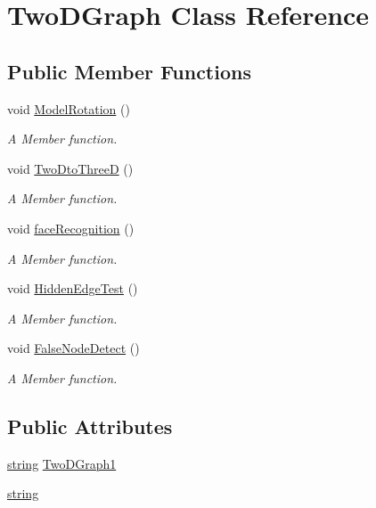 \hypertarget{classTwoDGraph}{}\section{Two\+D\+Graph Class Reference}
\label{classTwoDGraph}
\subsection*{Public Member Functions}
\begin{DoxyCompactItemize}
\item 
void \hyperlink{classTwoDGraph_a1eb77cb9e303bdcd28f985a1f3ca02b4}{Model\+Rotation} ()
\begin{DoxyCompactList}\small\item\em A Member function. \end{DoxyCompactList}\item 
void \hyperlink{classTwoDGraph_a54093bf95a87106de242cc8b8050243e}{Two\+Dto\+ThreeD} ()
\begin{DoxyCompactList}\small\item\em A Member function. \end{DoxyCompactList}\item 
void \hyperlink{classTwoDGraph_a7606c71011057d955db34a43e672ffd9}{face\+Recognition} ()
\begin{DoxyCompactList}\small\item\em A Member function. \end{DoxyCompactList}\item 
void \hyperlink{classTwoDGraph_af25742b8b2903fe231a7ccbbfbb48e08}{Hidden\+Edge\+Test} ()
\begin{DoxyCompactList}\small\item\em A Member function. \end{DoxyCompactList}\item 
void \hyperlink{classTwoDGraph_a48b9e1804733df394bd2bc2c78fec6aa}{False\+Node\+Detect} ()
\begin{DoxyCompactList}\small\item\em A Member function. \end{DoxyCompactList}\end{DoxyCompactItemize}
\subsection*{Public Attributes}
\begin{DoxyCompactItemize}
\item 
\hyperlink{classTwoDGraph_ab537370d1b1d448f9bba38f6b9f7b7ee}{string} \hyperlink{classTwoDGraph_ae842ed89c9e1e66c81aaecae003510f3}{Two\+D\+Graph1}
\item 
\hyperlink{classTwoDGraph_ab537370d1b1d448f9bba38f6b9f7b7ee}{string}
\end{DoxyCompactItemize}


